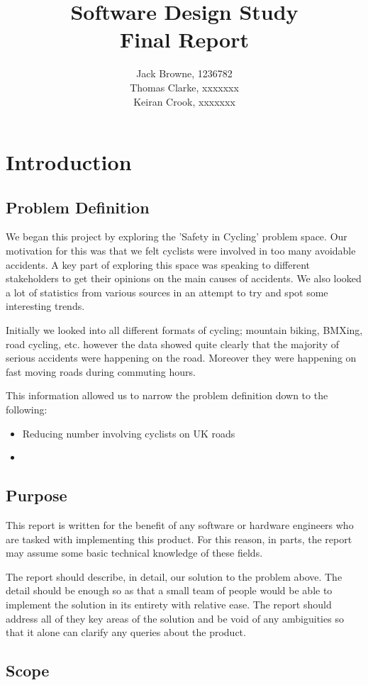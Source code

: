 \documentclass[]{report}
\title{Software Design Study\\Final Report}
\author{Jack Browne, 1236782\\Thomas Clarke, xxxxxxx\\Keiran Crook, xxxxxxx}
\begin{document}
\maketitle

\tableofcontents

\chapter{Introduction}
\section{Problem Definition}
We began this project by exploring the 'Safety in Cycling' problem space. Our motivation for this was that we felt cyclists were involved in too many avoidable accidents. 
A key part of exploring this space was speaking to different stakeholders to get their opinions on the main causes of accidents. We also looked a lot of statistics from various sources in an attempt to try and spot some interesting trends.

Initially we looked into all different formats of cycling; mountain biking, BMXing, road cycling, etc. however the data showed quite clearly that the majority of serious accidents were happening on the road. Moreover they were happening on fast moving roads during commuting hours.

This information allowed us to narrow the problem definition down to the following:
\begin{itemize}
  \item Reducing number involving cyclists on UK roads
  \item 
\end{itemize}
\section{Purpose}
This report is written for the benefit of any software or hardware engineers who are tasked with implementing this product. For this reason, in parts, the report may assume some basic technical knowledge of these fields. 

The report should describe, in detail, our solution to the problem above. The detail should be enough so as that a small team of people would be able to implement the solution in its entirety with relative ease. The report should address all of they key areas of the solution and be void of any ambiguities so that it alone can clarify any queries about the product.
\section{Scope}
\end{document}
